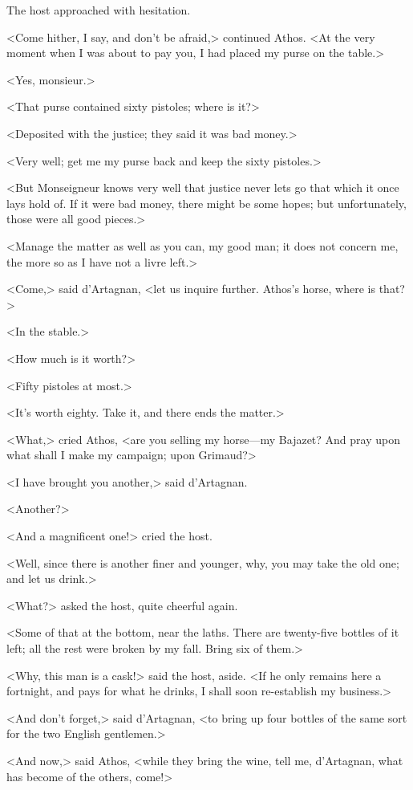 The host approached with hesitation. 

<Come hither, I say, and don't be afraid,> continued Athos. <At the very moment when I was about to pay you, I had placed my purse on the table.> 

<Yes, monsieur.> 

<That purse contained sixty pistoles; where is it?> 

<Deposited with the justice; they said it was bad money.> 

<Very well; get me my purse back and keep the sixty pistoles.> 

<But Monseigneur knows very well that justice never lets go that which it once lays hold of. If it were bad money, there might be some hopes; but unfortunately, those were all good pieces.> 

<Manage the matter as well as you can, my good man; it does not concern me, the more so as I have not a livre left.> 

<Come,> said d'Artagnan, <let us inquire further. Athos's horse, where is that?> 

<In the stable.> 

<How much is it worth?> 

<Fifty pistoles at most.> 

<It's worth eighty. Take it, and there ends the matter.> 

<What,> cried Athos, <are you selling my horse---my Bajazet? And pray upon what shall I make my campaign; upon Grimaud?> 

<I have brought you another,> said d'Artagnan. 

<Another?> 

<And a magnificent one!> cried the host. 

<Well, since there is another finer and younger, why, you may take the old one; and let us drink.> 

<What?> asked the host, quite cheerful again. 

<Some of that at the bottom, near the laths. There are twenty-five bottles of it left; all the rest were broken by my fall. Bring six of them.> 

<Why, this man is a cask!> said the host, aside. <If he only remains here a fortnight, and pays for what he drinks, I shall soon re-establish my business.> 

<And don't forget,> said d'Artagnan, <to bring up four bottles of the same sort for the two English gentlemen.> 

<And now,> said Athos, <while they bring the wine, tell me, d'Artagnan, what has become of the others, come!> 

